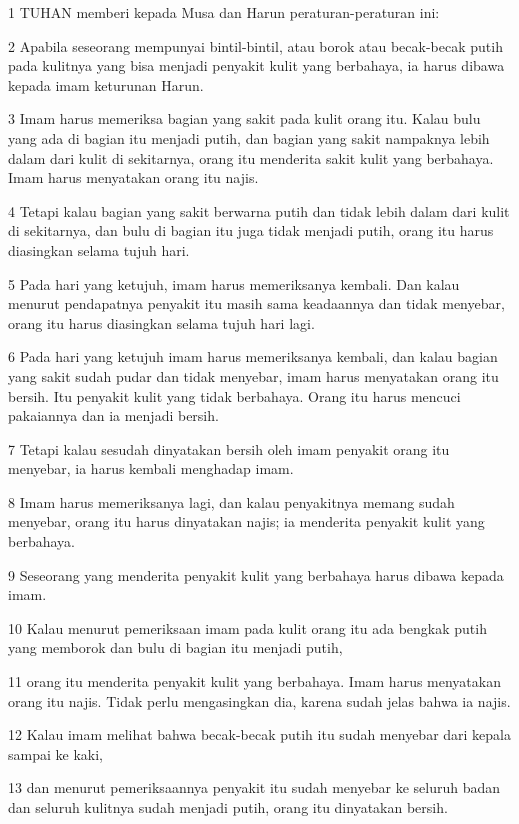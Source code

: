 \par 1 TUHAN memberi kepada Musa dan Harun peraturan-peraturan ini:
\par 2 Apabila seseorang mempunyai bintil-bintil, atau borok atau becak-becak putih pada kulitnya yang bisa menjadi penyakit kulit yang berbahaya, ia harus dibawa kepada imam keturunan Harun.
\par 3 Imam harus memeriksa bagian yang sakit pada kulit orang itu. Kalau bulu yang ada di bagian itu menjadi putih, dan bagian yang sakit nampaknya lebih dalam dari kulit di sekitarnya, orang itu menderita sakit kulit yang berbahaya. Imam harus menyatakan orang itu najis.
\par 4 Tetapi kalau bagian yang sakit berwarna putih dan tidak lebih dalam dari kulit di sekitarnya, dan bulu di bagian itu juga tidak menjadi putih, orang itu harus diasingkan selama tujuh hari.
\par 5 Pada hari yang ketujuh, imam harus memeriksanya kembali. Dan kalau menurut pendapatnya penyakit itu masih sama keadaannya dan tidak menyebar, orang itu harus diasingkan selama tujuh hari lagi.
\par 6 Pada hari yang ketujuh imam harus memeriksanya kembali, dan kalau bagian yang sakit sudah pudar dan tidak menyebar, imam harus menyatakan orang itu bersih. Itu penyakit kulit yang tidak berbahaya. Orang itu harus mencuci pakaiannya dan ia menjadi bersih.
\par 7 Tetapi kalau sesudah dinyatakan bersih oleh imam penyakit orang itu menyebar, ia harus kembali menghadap imam.
\par 8 Imam harus memeriksanya lagi, dan kalau penyakitnya memang sudah menyebar, orang itu harus dinyatakan najis; ia menderita penyakit kulit yang berbahaya.
\par 9 Seseorang yang menderita penyakit kulit yang berbahaya harus dibawa kepada imam.
\par 10 Kalau menurut pemeriksaan imam pada kulit orang itu ada bengkak putih yang memborok dan bulu di bagian itu menjadi putih,
\par 11 orang itu menderita penyakit kulit yang berbahaya. Imam harus menyatakan orang itu najis. Tidak perlu mengasingkan dia, karena sudah jelas bahwa ia najis.
\par 12 Kalau imam melihat bahwa becak-becak putih itu sudah menyebar dari kepala sampai ke kaki,
\par 13 dan menurut pemeriksaannya penyakit itu sudah menyebar ke seluruh badan dan seluruh kulitnya sudah menjadi putih, orang itu dinyatakan bersih.
